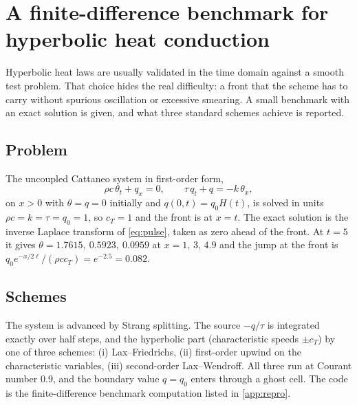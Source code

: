 \section{A finite-difference benchmark for hyperbolic heat conduction}\label{sec:schemes}

Hyperbolic heat laws are usually validated in the time domain against a smooth test problem. That choice hides the real difficulty: a front that the scheme has to carry without spurious oscillation or excessive smearing. A small benchmark with an exact solution is given, and what three standard schemes achieve is reported.

\subsection{Problem}
The uncoupled Cattaneo system in first-order form,
\begin{equation}
\rho c\,\theta_t+q_x=0,\qquad \tau\,q_t+q=-k\,\theta_x ,
\end{equation}
on $x>0$ with $\theta=q=0$ initially and $q(0,t)=q_0H(t)$, is solved in units $\rho c=k=\tau=q_0=1$, so $c_T=1$ and the front is at $x=t$. The exact solution is the inverse Laplace transform of \cref{eq:pulse}, taken as zero ahead of the front. At $t=5$ it gives $\theta=1.7615,\ 0.5923,\ 0.0959$ at $x=1,\,3,\,4.9$ and the jump at the front is $q_0e^{-x/2\ell}/(\rho cc_T)=e^{-2.5}=0.082$.

\subsection{Schemes}
The system is advanced by Strang splitting. The source $-q/\tau$ is integrated exactly over half steps, and the hyperbolic part (characteristic speeds $\pm c_T$) by one of three schemes: (i) Lax--Friedrichs, (ii) first-order upwind on the characteristic variables, (iii) second-order Lax--Wendroff. All three run at Courant number $0.9$, and the boundary value $q=q_0$ enters through a ghost cell. The code is the finite-difference benchmark computation listed in \cref{app:repro}.

